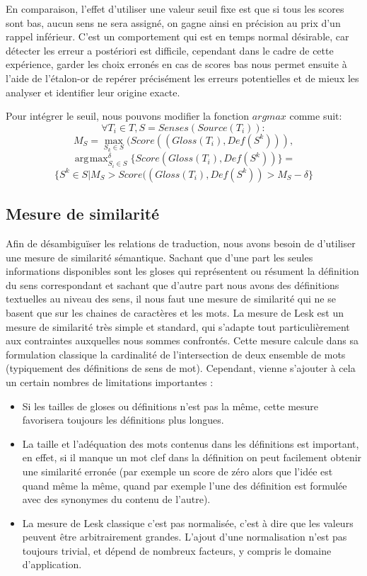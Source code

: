 \documentclass[10pt,a4paper,twoside]{article}
\DeclareMathOperator*{\argmax}{arg\!\max}
\begin{document}
En comparaison, l'effet d'utiliser une valeur seuil fixe est que si tous les scores sont bas, aucun sens ne sera assigné, on gagne ainsi en précision au prix d'un rappel inférieur. C'est un comportement qui est en temps normal désirable, car détecter les erreur a postériori est difficile, cependant dans le cadre de cette expérience, garder les choix erronés en cas de scores bas nous permet ensuite à l'aide de l'étalon-or de repérer précisément les erreurs potentielles et de mieux les analyser et identifier leur origine exacte. 

Pour intégrer le seuil, nous pouvons modifier la fonction \(argmax\) comme suit:
\[
\forall T_i \in T, S=Senses(Source(T_i)): 
\]
\[
M_S = \max_{S_k\in S}(Score((Gloss(T_i),Def(S^k))),
\]
\[
\argmax_{S_i\in S}^\delta \{Score(Gloss(T_i),Def(S^k))\}=
\]
\[
\{S^k\in S|  M_S > Score((Gloss(T_i),Def(S^k)) > M_S-\delta \}
\]

\subsection{Mesure de similarité}
Afin de désambiguïser les relations de traduction, nous avons besoin de d'utiliser une mesure de similarité sémantique. Sachant que d'une part les seules informations disponibles sont les gloses qui représentent ou résument la définition du sens correspondant et sachant que d'autre part nous avons des définitions textuelles au niveau des sens, il nous faut une mesure de similarité qui ne se basent que sur les chaines de caractères et les mots. 
La mesure de Lesk \cite{citeulike:625530} est un mesure de similarité très simple et standard, qui s'adapte tout particulièrement aux contraintes auxquelles nous sommes confrontés. Cette mesure calcule dans sa formulation classique la cardinalité de l'intersection de deux ensemble de mots (typiquement des définitions de sens de mot).
 Cependant, vienne s'ajouter à cela un certain nombres de limitations importantes :
\begin{itemize}
	\item Si les tailles de gloses ou définitions n'est pas la même, cette mesure favorisera toujours les définitions plus longues. 
	\item La taille et l'adéquation des mots contenus dans les définitions est important, en effet, si il manque un mot clef dans la définition on peut facilement obtenir une similarité erronée (par exemple un score de zéro alors que l'idée est quand même la même, quand par exemple l'une des définition est formulée avec des synonymes du contenu de l'autre).  
	\item La mesure de Lesk classique c'est pas normalisée, c'est à dire que les valeurs peuvent être arbitrairement grandes. L'ajout d'une normalisation n'est pas toujours trivial, et dépend de nombreux facteurs, y compris le domaine d'application.
\end{itemize}
 
\end{document}
